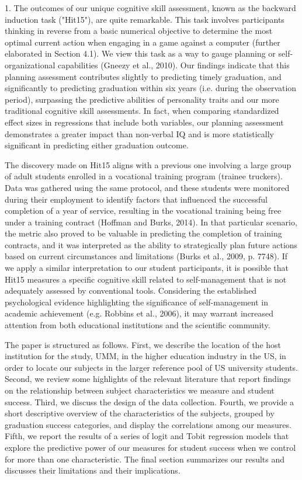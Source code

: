 \documentclass[12pt,a4paper]{article}
\begin{document}
1. The outcomes of our unique cognitive skill assessment, known as the backward induction task ("Hit15"), are quite remarkable. This task involves participants thinking in reverse from a basic numerical objective to determine the most optimal current action when engaging in a game against a computer (further elaborated in Section 4.1). We view this task as a way to gauge planning or self-organizational capabilities (Gneezy et al., 2010). Our findings indicate that this planning assessment contributes slightly to predicting timely graduation, and significantly to predicting graduation within six years (i.e. during the observation period), surpassing the predictive abilities of personality traits and our more traditional cognitive skill assessments. In fact, when comparing standardized effect sizes in regressions that include both variables, our planning assessment demonstrates a greater impact than non-verbal IQ and is more statistically significant in predicting either graduation outcome.

The discovery made on Hit15 aligns with a previous one involving a large group of adult students enrolled in a vocational training program (trainee truckers). Data was gathered using the same protocol, and these students were monitored during their employment to identify factors that influenced the successful completion of a year of service, resulting in the vocational training being free under a training contract (Hoffman and Burks, 2014). In that particular scenario, the metric also proved to be valuable in predicting the completion of training contracts, and it was interpreted as the ability to strategically plan future actions based on current circumstances and limitations (Burks et al., 2009, p. 7748). If we apply a similar interpretation to our student participants, it is possible that Hit15 measures a specific cognitive skill related to self-management that is not adequately assessed by conventional tools. Considering the established psychological evidence highlighting the significance of self-management in academic achievement (e.g. Robbins et al., 2006), it may warrant increased attention from both educational institutions and the scientific community.

The paper is structured as follows. First, we describe the location of the host institution for the study, UMM, in the higher
education industry in the US, in order to locate our subjects in the larger reference pool of US university students. Second,
we review some highlights of the relevant literature that report findings on the relationship between subject characteristics
we measure and student success. Third, we discuss the design of the data collection. Fourth, we provide a short descriptive
overview of the characteristics of the subjects, grouped by graduation success categories, and display the correlations among
our measures. Fifth, we report the results of a series of logit and Tobit regression models that explore the predictive power
of our measures for student success when we control for more than one characteristic. The final section summarizes our
results and discusses their limitations and their implications.
\end{document}
